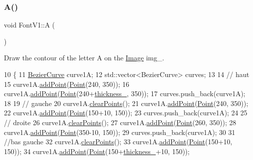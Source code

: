 \subsubsection{\texorpdfstring{A()}{A()}}
{\footnotesize\ttfamily void Font\+V1\+::A (\begin{DoxyParamCaption}{ }\end{DoxyParamCaption})}



Draw the contour of the letter A on the \mbox{\hyperlink{class_image}{Image}} img\+\_\+. 


\begin{DoxyCode}
10               \{
11     \mbox{\hyperlink{class_bezier_curve}{BezierCurve}} curve1A;
12     std::vector<BezierCurve> curves;
13 
14     \textcolor{comment}{// haut}
15     curve1A.\mbox{\hyperlink{class_bezier_curve_a38d16c18b36ae45619b05e26e226cf34}{addPoint}}(\mbox{\hyperlink{class_point}{Point}}(240, 350));
16     curve1A.\mbox{\hyperlink{class_bezier_curve_a38d16c18b36ae45619b05e26e226cf34}{addPoint}}(\mbox{\hyperlink{class_point}{Point}}(240+\mbox{\hyperlink{class_font_v1_aed8040e76be9a52833627b92f0fb4e5f}{thickness\_}}, 350));
17     curves.push\_back(curve1A);
18 
19     \textcolor{comment}{// gauche}
20     curve1A.\mbox{\hyperlink{class_bezier_curve_a0ba8ce66d5af5971ae6a1b506029728e}{clearPoints}}();
21     curve1A.\mbox{\hyperlink{class_bezier_curve_a38d16c18b36ae45619b05e26e226cf34}{addPoint}}(\mbox{\hyperlink{class_point}{Point}}(240, 350));
22     curve1A.\mbox{\hyperlink{class_bezier_curve_a38d16c18b36ae45619b05e26e226cf34}{addPoint}}(\mbox{\hyperlink{class_point}{Point}}(150+10, 150));
23     curves.push\_back(curve1A);
24 
25     \textcolor{comment}{// droite}
26     curve1A.\mbox{\hyperlink{class_bezier_curve_a0ba8ce66d5af5971ae6a1b506029728e}{clearPoints}}();
27     curve1A.\mbox{\hyperlink{class_bezier_curve_a38d16c18b36ae45619b05e26e226cf34}{addPoint}}(\mbox{\hyperlink{class_point}{Point}}(260, 350));
28     curve1A.\mbox{\hyperlink{class_bezier_curve_a38d16c18b36ae45619b05e26e226cf34}{addPoint}}(\mbox{\hyperlink{class_point}{Point}}(350-10, 150));
29     curves.push\_back(curve1A);
30 
31     \textcolor{comment}{//bas gauche}
32     curve1A.\mbox{\hyperlink{class_bezier_curve_a0ba8ce66d5af5971ae6a1b506029728e}{clearPoints}}();
33     curve1A.\mbox{\hyperlink{class_bezier_curve_a38d16c18b36ae45619b05e26e226cf34}{addPoint}}(\mbox{\hyperlink{class_point}{Point}}(150+10, 150));
34     curve1A.\mbox{\hyperlink{class_bezier_curve_a38d16c18b36ae45619b05e26e226cf34}{addPoint}}(\mbox{\hyperlink{class_point}{Point}}(150+\mbox{\hyperlink{class_font_v1_aed8040e76be9a52833627b92f0fb4e5f}{thickness\_}}+10, 150));

\end{DoxyCode}
